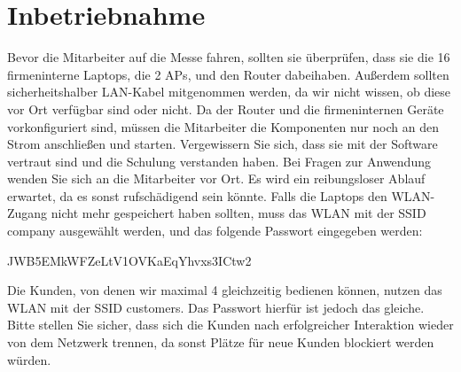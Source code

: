 \section{Inbetriebnahme}
Bevor die Mitarbeiter auf die Messe fahren, sollten sie überprüfen, dass sie die 16 firmeninterne Laptops, die 2 APs, und den Router dabeihaben. Außerdem sollten sicherheitshalber LAN-Kabel mitgenommen werden, da wir nicht wissen, ob diese vor Ort verfügbar sind oder nicht. Da der Router und die firmeninternen Geräte vorkonfiguriert sind, müssen die Mitarbeiter die Komponenten nur noch an den Strom anschließen und starten. Vergewissern Sie sich, dass sie mit der Software vertraut sind und die Schulung verstanden haben. Bei Fragen zur Anwendung wenden Sie sich an die Mitarbeiter vor Ort. Es wird ein reibungsloser Ablauf erwartet, da es sonst rufschädigend sein könnte. Falls die Laptops den WLAN-Zugang nicht mehr gespeichert haben sollten, muss das WLAN mit der SSID company ausgewählt werden, und das folgende Passwort eingegeben werden:

JWB5EMkWFZeLtV1OVKaEqYhvxs3ICtw2

Die Kunden, von denen wir maximal 4 gleichzeitig bedienen können, nutzen das WLAN mit der SSID customers. Das Passwort hierfür ist jedoch das gleiche. Bitte stellen Sie sicher, dass sich die Kunden nach erfolgreicher Interaktion wieder von dem Netzwerk trennen, da sonst Plätze für neue Kunden blockiert werden würden.
 